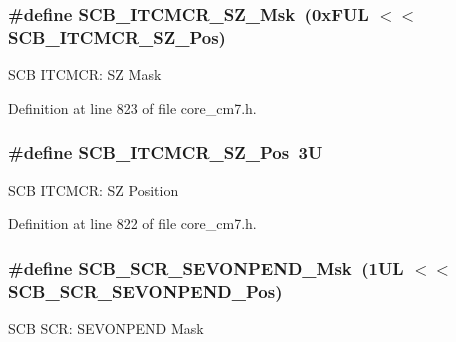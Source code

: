 \subsubsection[{\texorpdfstring{S\+C\+B\+\_\+\+I\+T\+C\+M\+C\+R\+\_\+\+S\+Z\+\_\+\+Msk}{SCB_ITCMCR_SZ_Msk}}]{\setlength{\rightskip}{0pt plus 5cm}\#define S\+C\+B\+\_\+\+I\+T\+C\+M\+C\+R\+\_\+\+S\+Z\+\_\+\+Msk~(0x\+F\+U\+L $<$$<$ S\+C\+B\+\_\+\+I\+T\+C\+M\+C\+R\+\_\+\+S\+Z\+\_\+\+Pos)}\hypertarget{group___c_m_s_i_s___s_c_b_ga2aca0f00fd91071567dfa596eaa136de}{}\label{group___c_m_s_i_s___s_c_b_ga2aca0f00fd91071567dfa596eaa136de}
S\+CB I\+T\+C\+M\+CR\+: SZ Mask 

Definition at line 823 of file core\+\_\+cm7.\+h.

\subsubsection[{\texorpdfstring{S\+C\+B\+\_\+\+I\+T\+C\+M\+C\+R\+\_\+\+S\+Z\+\_\+\+Pos}{SCB_ITCMCR_SZ_Pos}}]{\setlength{\rightskip}{0pt plus 5cm}\#define S\+C\+B\+\_\+\+I\+T\+C\+M\+C\+R\+\_\+\+S\+Z\+\_\+\+Pos~3U}\hypertarget{group___c_m_s_i_s___s_c_b_ga86b58242b8286aba9318e2062d88f341}{}\label{group___c_m_s_i_s___s_c_b_ga86b58242b8286aba9318e2062d88f341}
S\+CB I\+T\+C\+M\+CR\+: SZ Position 

Definition at line 822 of file core\+\_\+cm7.\+h.

\subsubsection[{\texorpdfstring{S\+C\+B\+\_\+\+S\+C\+R\+\_\+\+S\+E\+V\+O\+N\+P\+E\+N\+D\+\_\+\+Msk}{SCB_SCR_SEVONPEND_Msk}}]{\setlength{\rightskip}{0pt plus 5cm}\#define S\+C\+B\+\_\+\+S\+C\+R\+\_\+\+S\+E\+V\+O\+N\+P\+E\+N\+D\+\_\+\+Msk~(1\+U\+L $<$$<$ S\+C\+B\+\_\+\+S\+C\+R\+\_\+\+S\+E\+V\+O\+N\+P\+E\+N\+D\+\_\+\+Pos)}\hypertarget{group___c_m_s_i_s___s_c_b_gafb98656644a14342e467505f69a997c9}{}\label{group___c_m_s_i_s___s_c_b_gafb98656644a14342e467505f69a997c9}
S\+CB S\+CR\+: S\+E\+V\+O\+N\+P\+E\+ND Mask 

